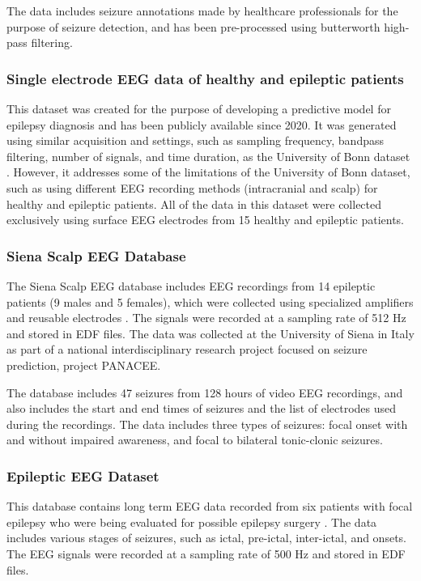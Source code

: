 The data includes seizure annotations made by healthcare professionals for the purpose of seizure detection, and has been pre-processed using butterworth high-pass filtering.

\subsubsection{Single electrode EEG data of healthy and epileptic patients}
This dataset was created for the purpose of developing a predictive model for epilepsy diagnosis and has been publicly available since 2020. It was generated using similar acquisition and settings, such as sampling frequency, bandpass filtering, number of signals, and time duration, as the University of Bonn dataset \cite{panwar_automated_2019, panwar_single_2020}. 
However, it addresses some of the limitations of the University of Bonn dataset, such as using different \gls{EEG} recording methods (intracranial and scalp) for healthy and epileptic patients. All of the data in this dataset were collected exclusively using surface \gls{EEG} electrodes from 15 healthy and epileptic patients.

\subsubsection{Siena Scalp EEG Database}
The Siena Scalp EEG database includes \gls{EEG} recordings from 14 epileptic patients (9 males and 5 females), which were collected using specialized amplifiers and reusable electrodes \cite{detti_eeg_2020, detti_paolo_siena_2020}. The signals were recorded at a sampling rate of 512 Hz and stored in EDF files. The data was collected at the University of Siena in Italy as part of a national interdisciplinary research project focused on seizure prediction, project PANACEE. 

The database includes 47 seizures from 128 hours of video \gls{EEG} recordings, and also includes the start and end times of seizures and the list of electrodes used during the recordings. The data includes three types of seizures: focal onset with and without impaired awareness, and focal to bilateral tonic-clonic seizures.

\subsubsection{Epileptic EEG Dataset}
This database contains long term \gls{EEG} data recorded from six patients with focal epilepsy who were being evaluated for possible epilepsy surgery \cite{nasreddine_epileptic_2021}. The data includes various stages of seizures, such as ictal, pre-ictal, inter-ictal, and onsets. The \gls{EEG} signals were recorded at a sampling rate of 500 Hz and stored in \gls{EDF} files. 

